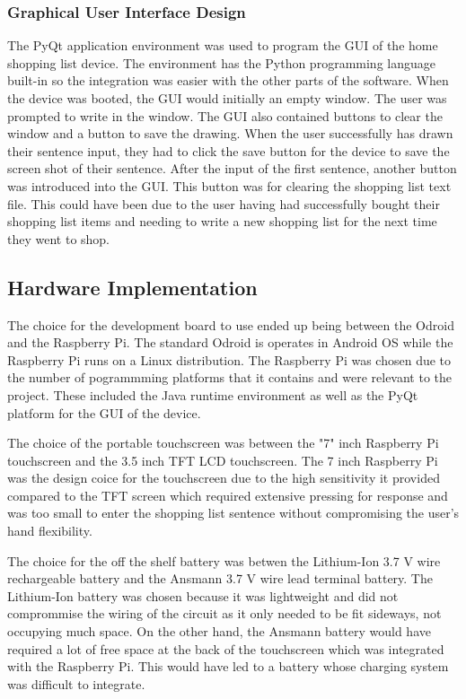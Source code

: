 \subsubsection{Graphical User Interface Design}
The PyQt application environment was used to program the GUI of the home shopping list device. The environment has the Python programming language built-in so the integration was easier with the other parts of the software. When the device was booted, the GUI would initially an empty window. The user was prompted to write in the window. The GUI also contained buttons to clear the window and a button to save the drawing. When the user successfully has drawn their sentence input, they had to click the save button for the device to save the screen shot of their sentence. After the input of the first sentence, another button was introduced into the GUI. This button was for clearing the shopping list text file. This could have been due to the user having had successfully bought their shopping list items and needing to write a new shopping list for the next time they went to shop.
\subsection{Hardware Implementation}
The choice for the development board to use ended up being between the Odroid and the Raspberry Pi. The standard Odroid is operates in Android OS while the Raspberry Pi runs on a Linux distribution. The Raspberry Pi was chosen due to the number of pogrammming platforms that it contains and were relevant to the project. These included the Java runtime environment as well as the PyQt platform for the GUI of the device.

The choice of the portable touchscreen was between the "7" inch Raspberry Pi touchscreen and the 3.5 inch TFT LCD touchscreen. The 7 inch Raspberry Pi was the design coice for the touchscreen due to the high sensitivity it provided compared to the TFT screen which required extensive pressing for response and was too small to enter the shopping list sentence without compromising the user's hand flexibility. 

The choice for the off the shelf battery was betwen the Lithium-Ion 3.7 V wire rechargeable battery and the Ansmann 3.7 V wire lead terminal battery. The Lithium-Ion battery was chosen because it was lightweight and did not comprommise the wiring of the circuit as it only needed to be fit sideways, not occupying much space. On the other hand, the Ansmann battery would have required a lot of free space at the back of the touchscreen which was integrated with the Raspberry Pi. This would have led to a battery whose charging system was difficult to integrate. 

